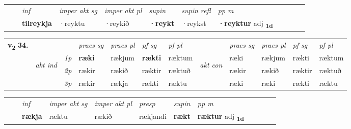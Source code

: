 \begin{tabular}{llllllllllll}
 & & \textit{inf} & \textit{imper akt sg} & \textit{imper akt pl}    & \textit{supin} & \textit{supin refl} & \textit{pp m}     \\*
  & & \textbf{tilreykja} & ·reyktu  & ·reykið    &  \textbf{·reykt} & ·reykst & \textbf{·reyktur} adj \textbf{\textsubscript{1d}} \\*
\cmidrule{1-12}
\end{tabular}



\begin{tabular}{llllllllllll} \toprule
\multirow{4}{*}{{{\textbf{v{\textsubscript{2}}} \Large{\textbf{34.}}}}}  & &   &  \textit{praes sg}  & \textit{praes pl}  &\textit{ pf sg} & \textit{pf pl} &  &  \textit{praes sg}  & \textit{praes pl}  & \textit{pf sg} & \textit{pf pl } \\*
	\cmidrule{4-7} \cmidrule{9-12}
 & \multirow{3}{*}{\begin{turn}{90}\textit{akt ind}\end{turn}} & {\textit{1p}} & \textbf{ræki} & rækjum    & \textbf{rækti} & ræktum & \multirow{3}{*}{\begin{turn}{90}\textit{akt con}\end{turn}} &ræki & rækjum & rækti & ræktum\\*
& &  {\textit{2p}} &  rækir  & rækið   & ræktir & ræktuð & & rækir & rækið & ræktir & ræktuð \\*
& &  {\textit{3p}} & rækir & rækja   & rækti & ræktu & & ræki & ræki& rækti & ræktu  \\*
\cmidrule{4-7} \cmidrule{9-12}
\end{tabular}


\begin{tabular}{llllllllllll}
 & & \textit{inf} & \textit{imper akt sg} & \textit{imper akt pl}   & \textit{presp} & \textit{supin}  & \textit{pp m}     \\*
  & & \textbf{rækja} & ræktu  & rækið   & rækjandi &  \textbf{rækt}  & \textbf{ræktur} adj \textbf{\textsubscript{1d}} \\*
\cmidrule{1-12}
\end{tabular}




